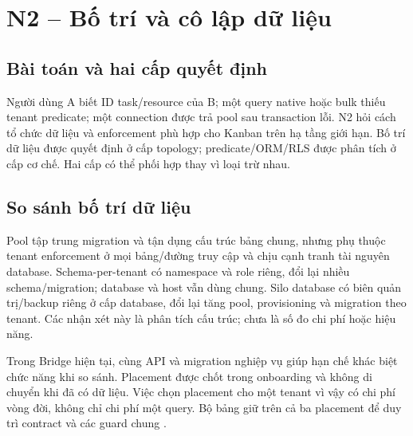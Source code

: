 \section{N2 -- Bố trí và cô lập dữ liệu}\label{sec:n2}
\subsection{Bài toán và hai cấp quyết định}
Người dùng A biết ID task\slash resource của B; một query native hoặc bulk thiếu tenant predicate; một connection được trả pool sau transaction lỗi. N2 hỏi cách tổ chức dữ liệu và enforcement phù hợp cho Kanban trên hạ tầng giới hạn. Bố trí dữ liệu được quyết định ở cấp topology; predicate\slash ORM\slash RLS được phân tích ở cấp cơ chế. Hai cấp có thể phối hợp thay vì loại trừ nhau.

\subsection{So sánh bố trí dữ liệu}
Pool tập trung migration và tận dụng cấu trúc bảng chung, nhưng phụ thuộc tenant enforcement ở mọi bảng\slash đường truy cập và chịu cạnh tranh tài nguyên database. Schema-per-tenant có namespace và role riêng, đổi lại nhiều schema\slash migration; database và host vẫn dùng chung. Silo database có biên quản trị\slash backup riêng ở cấp database, đổi lại tăng pool, provisioning và migration theo tenant. Các nhận xét này là phân tích cấu trúc; chưa là số đo chi phí hoặc hiệu năng.


Trong Bridge hiện tại, cùng API và migration nghiệp vụ giúp hạn chế khác biệt chức năng khi so sánh. Placement được chốt trong onboarding và không di chuyển khi đã có dữ liệu. Việc chọn placement cho một tenant vì vậy có chi phí vòng đời, không chỉ chi phí một query. Bộ bảng giữ  trên cả ba placement để duy trì contract và các guard chung .

